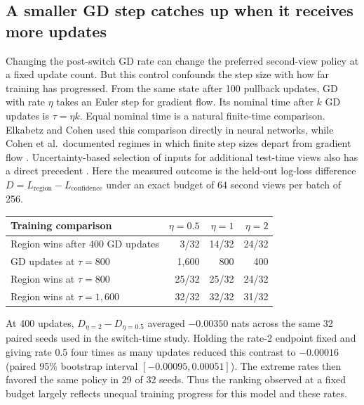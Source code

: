 \subsection{A smaller GD step catches up when it receives more updates}

Changing the post-switch GD rate can change the preferred second-view policy at a fixed update count. But this control confounds the step size with how far training has progressed. From the same state after 100 pullback updates, GD with rate \(\eta\) takes an Euler step for gradient flow. Its nominal time after \(k\) GD updates is \(\tau=\eta k\). Equal nominal time is a natural finite-time comparison. Elkabetz and Cohen used this comparison directly in neural networks, while Cohen et al.\ documented regimes in which finite step sizes depart from gradient flow \cite{elkabetz2021continuous,cohen2021edge}. Uncertainty-based selection of inputs for additional test-time views also has a direct precedent \cite{son2023selective}. Here the measured outcome is the held-out log-loss difference \(D=L_{\mathrm{region}}-L_{\mathrm{confidence}}\) under an exact budget of 64 second views per batch of 256.

\begin{center}
\begin{tabular}{lrrr}
\hline
Training comparison & \(\eta=0.5\) & \(\eta=1\) & \(\eta=2\)\\
\hline
Region wins after 400 GD updates        & 3/32 & 14/32 & 24/32\\
GD updates at \(\tau=800\)             & 1,600 & 800 & 400\\
Region wins at \(\tau=800\)            & 25/32 & 25/32 & 24/32\\
Region wins at \(\tau=1{,}600\)        & 32/32 & 32/32 & 31/32\\
\hline
\end{tabular}
\end{center}

At 400 updates, \(D_{\eta=2}-D_{\eta=0.5}\) averaged \(-0.00350\) nats across the same 32 paired seeds used in the switch-time study. Holding the rate-2 endpoint fixed and giving rate 0.5 four times as many updates reduced this contrast to \(-0.00016\) (paired 95\% bootstrap interval \([-0.00095,0.00051]\)). The extreme rates then favored the same policy in 29 of 32 seeds. Thus the ranking observed at a fixed budget largely reflects unequal training progress for this model and these rates.

